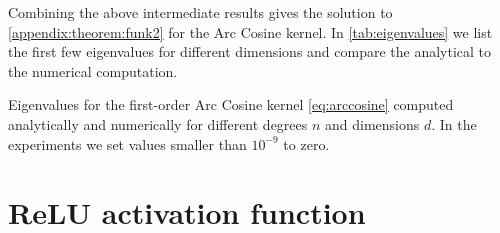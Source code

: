 Combining the above intermediate results gives the solution to \cref{appendix:theorem:funk2} for the Arc Cosine kernel. In \cref{tab:eigenvalues} we list the first few eigenvalues for different dimensions and compare the analytical to the numerical computation. 

\begin{table}[tbh]
    \centering
    \caption{Eigenvalues for the first-order Arc Cosine kernel \cref{eq:arccosine}  computed analytically and numerically for different degrees $n$ and dimensions $d$. In the experiments we set values smaller than $10^{-9}$ to zero. \label{tab:eigenvalues}}
    \vspace{.2cm}
    
\end{table}


\section{ReLU activation function}

